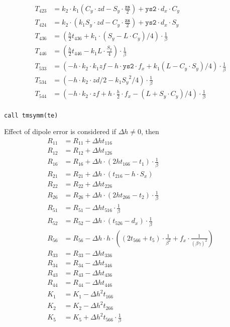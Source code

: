\documentclass{cern-art} %
\begin{document}
\[\begin{array}{rl}
     T_{423} &= {k_2}{\cdot}{k_1}\left({C_y}{\cdot} zd - {S_y}{\cdot} {\frac{\texttt{zs}}{2}}\right) + \texttt{ys2}{\cdot}{d_x}{\cdot}{C_y}\\
     T_{424} &= {k_2}{\cdot}\left({k_1}{S_y}{\cdot} zd - {C_y}{\cdot} {\frac{\texttt{zs}}{2}}\right) + \texttt{ys2}{\cdot}{d_x}{\cdot}{S_y}\\
     T_{436} &= \left(\frac{h}{2}t_{436} + {k_1} {\cdot} \left({S_y} - L{\cdot}{C_y}\right) / 4\right) {\cdot} {\frac 1 \beta}\\
     T_{446} &= \left(\frac{h}{2}t_{446} - {k_1} L{\cdot}\frac{S_y}{4}\right) {\cdot} {\frac 1 \beta}\\
     T_{533} &= \left(- h{\cdot} {k_2}{\cdot} {k_1}zf - h{\cdot} \texttt{ys2}{\cdot}{f_x} + {k_1}\left(L-{C_y}{\cdot}{S_y}\right)/4\right){\cdot} {\frac 1 \beta}\\
     T_{534} &= \left(- h{\cdot} {k_2}{\cdot} zd/2 - {k_1}{S_y}^2/4\right) {\cdot} {\frac 1 \beta}\\
     T_{544} &= \left(- h{\cdot} {k_2}{\cdot} zf + h{\cdot}\frac{h}{2}{\cdot}{f_x} - \left(L + {S_y}{\cdot}{C_y}\right)/4\right) {\cdot} {\frac 1 \beta}\\
     \end{array}
\]
\begin{lstlisting}[firstnumber=last]
call tmsymm(te)
\end{lstlisting}
Effect of dipole error is considered if $\Delta h \neq 0$, then
\[\begin{array}{rl}
        R_{11} &= R_{11} + {\Delta h} t_{116}\\
        R_{12} &= R_{12} + {\Delta h} t_{126}\\
        R_{16} &= R_{16} + {\Delta h} {\cdot} (2  ht_{166} - t_1) {\cdot} {\frac 1 \beta}\\
        R_{21} &= R_{21} + {\Delta h} {\cdot} (t_{216} - h{\cdot}{S_x})\\
        R_{22} &= R_{22} + {\Delta h} t_{226}\\
        R_{26} &= R_{26} + {\Delta h} {\cdot} (2  ht_{266} - t_2) {\cdot} {\frac 1 \beta}\\
        R_{51} &= R_{51} - {\Delta h} t_{516} {\cdot} {\frac 1 \beta}\\
        R_{52} &= R_{52} - {\Delta h} {\cdot} (t_{526} - {d_x}) {\cdot} {\frac 1 \beta}\\
        R_{56} &= R_{56} - {\Delta h} {\cdot} h {\cdot} ((2  t_{566} + t_5) {\cdot} {\frac 1{\beta^2}} + {f_x} {\cdot} \frac 1 {{(\beta\gamma)}^2})\\
        R_{33} &= R_{33} - {\Delta h} t_{336}\\
        R_{34} &= R_{34} - {\Delta h} t_{346}\\
        R_{43} &= R_{43} - {\Delta h} t_{436}\\
        R_{44} &= R_{44} - {\Delta h} t_{446}\\
        K_1 &= K_1 - {\Delta h}^2 t_{166}\\
        K_2 &= K_2 - {\Delta h}^2 t_{266}\\
        K_5 &= K_5 + {\Delta h}^2 t_{566} {\cdot} {\frac 1 \beta}\\
\end{array}
\]
\end{document}
